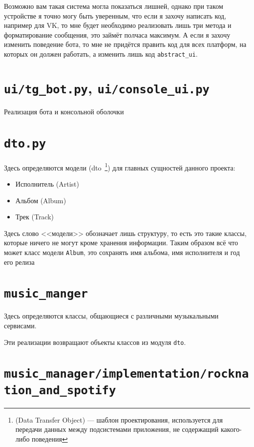 Возможно вам такая система могла показаться лишней, однако при таком устройстве я точно могу быть уверенным, что если я захочу написать код, например для VK, то мне будет необходимо реализовать лишь три метода и форматирование сообщения, это займёт полчаса максимум.  А если я захочу изменить поведение бота, то мне не придётся править код для всех платформ, на которых он должен работать, а изменить лишь код \texttt{abstract\_ui}.

\section*{\texttt{ui/tg\_bot.py}, \texttt{ui/console\_ui.py}}

Реализация бота и консольной оболочки

\section*{\texttt{dto.py}}

Здесь определяются модели (dto~\footnote{(Data Transfer Object) --- шаблон проектирования, используется для передачи данных между подсистемами приложения, не содержащий какого-либо поведения}) для главных сущностей данного проекта:

\begin{itemize}
\item Исполнитель (Artist)
\item Альбом (Album)
\item Трек (Track)
\end{itemize}

Здесь слово <<модели>> обозначает лишь структуру, то есть это такие классы, которые ничего не могут кроме хранения информации.  Таким образом всё что может класс модели \texttt{Album}, это сохранять имя альбома, имя исполнителя и год его релиза

\section*{\texttt{music\_manger}}

Здесь определяются классы, общающиеся с различными музыкальными сервисами.

Эти реализации возвращают объекты классов из модуля \texttt{dto}.

\section*{\texttt{music\_manager/implementation/rocknation\_and\_spotify}}

